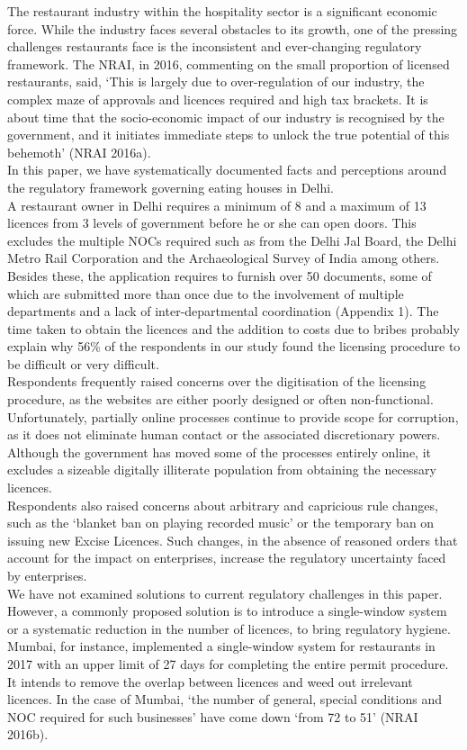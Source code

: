 \documentclass[a4paper, 12pt]{article}
\begin{document}
		The restaurant industry within the hospitality sector is a significant economic force. While the industry faces several obstacles to its growth, one of the pressing challenges restaurants face is the inconsistent and ever-changing regulatory framework. The NRAI, in 2016, commenting on the small proportion of licensed restaurants, said, ‘This is largely due to over-regulation of our industry, the complex maze of approvals and licences required and high tax brackets. It is about time that the socio-economic impact of our industry is recognised by the government, and it initiates immediate steps to unlock the true potential of this behemoth’ (NRAI 2016a).\\
		In this paper, we have systematically documented facts and perceptions around the regulatory framework governing eating houses in Delhi.\\
		A restaurant owner in Delhi requires a minimum of 8 and a maximum of 13 licences from 3 levels of government before he or she can open doors. This excludes the multiple NOCs required such as from the Delhi Jal Board, the Delhi Metro Rail Corporation and the Archaeological Survey of India among others. Besides these, the application requires to furnish over 50 documents, some of which are submitted more than once due to the involvement of multiple departments and a lack of inter-departmental coordination (Appendix 1). The time taken to obtain the licences and the addition to costs due to bribes probably explain why 56\% of the respondents in our study found the licensing procedure to be difficult or very difficult.\\%
		Respondents frequently raised concerns over the digitisation of the licensing procedure, as the websites are either poorly designed or often non-functional. Unfortunately, partially online processes continue to provide scope for corruption, as it does not eliminate human contact or the associated discretionary powers. Although the government has moved some of the processes entirely online, it excludes a sizeable digitally illiterate population from obtaining the necessary licences.\\
		Respondents also raised concerns about arbitrary and capricious rule changes, such as the ‘blanket ban on playing recorded music’ or the temporary ban on issuing new Excise Licences. Such changes, in the absence of reasoned orders that account for the impact on enterprises, increase the regulatory uncertainty faced by enterprises.\\
		We have not examined solutions to current regulatory challenges in this paper. However, a commonly proposed solution is to introduce a single-window system or a systematic reduction in the number of licences, to bring regulatory hygiene. Mumbai, for instance, implemented a single-window system for restaurants in 2017 with an upper limit of 27 days for completing the entire permit procedure. It intends to remove the overlap between licences and weed out irrelevant licences. In the case of Mumbai, ‘the number of general, special conditions and NOC required for such businesses’ have come down ‘from 72 to 51’ (NRAI 2016b).\\
\end{document}
